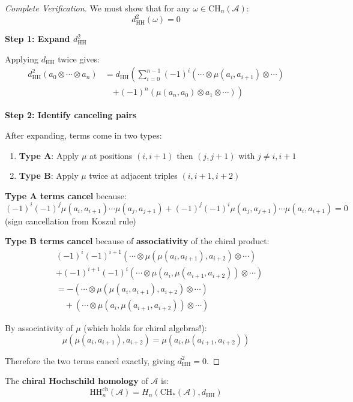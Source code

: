 \begin{proof}[Complete Verification]
We must show that for any $\omega \in \text{CH}_n(\mathcal{A})$:
$$d_{\text{HH}}^2(\omega) = 0$$

\textbf{Step 1: Expand $d_{\text{HH}}^2$}

Applying $d_{\text{HH}}$ twice gives:
\begin{align*}
d_{\text{HH}}^2(a_0 \otimes \cdots \otimes a_n) 
&= d_{\text{HH}}\left(\sum_{i=0}^{n-1} (-1)^i (\cdots \otimes \mu(a_i, a_{i+1}) 
   \otimes \cdots)\right. \\
&\quad\left. + (-1)^n (\mu(a_n, a_0) \otimes a_1 \otimes \cdots)\right)
\end{align*}

\textbf{Step 2: Identify canceling pairs}

After expanding, terms come in two types:
\begin{enumerate}
\item \textbf{Type A}: Apply $\mu$ at positions $(i,i+1)$ then $(j,j+1)$ with $j \neq i, i+1$
\item \textbf{Type B}: Apply $\mu$ twice at adjacent triples $(i,i+1,i+2)$
\end{enumerate}

\textbf{Type A terms cancel} because:
$$(-1)^i (-1)^j \mu(a_i,a_{i+1}) \cdots \mu(a_j,a_{j+1}) + 
   (-1)^j (-1)^i \mu(a_j,a_{j+1}) \cdots \mu(a_i,a_{i+1}) = 0$$
(sign cancellation from Koszul rule)

\textbf{Type B terms cancel} because of \textbf{associativity} of the chiral product:
\begin{align*}
&(-1)^i(-1)^{i+1}(\cdots \otimes \mu(\mu(a_i,a_{i+1}),a_{i+2}) \otimes \cdots) \\
&+ (-1)^{i+1}(-1)^i (\cdots \otimes \mu(a_i,\mu(a_{i+1},a_{i+2})) \otimes \cdots) \\
&= -(\cdots \otimes \mu(\mu(a_i,a_{i+1}),a_{i+2}) \otimes \cdots) \\
&\quad + (\cdots \otimes \mu(a_i,\mu(a_{i+1},a_{i+2})) \otimes \cdots)
\end{align*}

By associativity of $\mu$ (which holds for chiral algebras!):
$$\mu(\mu(a_i,a_{i+1}),a_{i+2}) = \mu(a_i,\mu(a_{i+1},a_{i+2}))$$

Therefore the two terms cancel exactly, giving $d_{\text{HH}}^2 = 0$.
\end{proof}

\begin{definition}
\label{def:chiral-HH}
The \textbf{chiral Hochschild homology} of $\mathcal{A}$ is:
$$\text{HH}_n^{\text{ch}}(\mathcal{A}) = H_n(\text{CH}_*(\mathcal{A}), d_{\text{HH}})$$
\end{definition}

